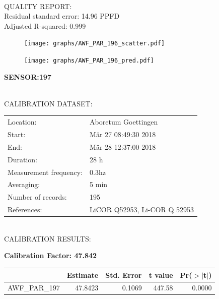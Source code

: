 \documentclass[oneside]{report}
\begin{document}
\hrulefill\\
QUALITY REPORT:\\
Residual standard error: 14.96 PPFD\\
Adjusted R-squared: 0.999



\begin{figure}[H]
  \centering
  \texttt{[image: graphs/AWF\_PAR\_196\_scatter.pdf]}
\end{figure}




\begin{figure}[H]
  \centering
  \texttt{[image: graphs/AWF\_PAR\_196\_pred.pdf]}
\end{figure}

\pagebreak


\begin{center}
\large{\textbf{SENSOR:197}}\\
\end{center}

\hrulefill\\
CALIBRATION DATASET:\\
\begin{table}[h!]
  \centering
  \label{tab:table1}
  \begin{tabular}{ll}
    Location: & Aboretum Goettingen\\ 
    
    
    Start:  & Mär 27 08:49:30 2018 \\
    End:   & Mär 28 12:37:00 2018\\ 
    Duration: & 28 h\\
    Measurement frequency: & 0.3hz\\
    Averaging:  &5 min\\
    Number of records: & 195 \\
    References: & LiCOR Q52953, Li-COR Q 52953 \\
  \end{tabular}
\end{table}

\hrulefill\\
CALIBRATION RESULTS:\\


\begin{center}
\textbf{\large{Calibration Factor: 47.842}}\\
\end{center}
\begin{table}[ht]
\centering
\begin{tabular}{rrrrr}
  \hline
 & Estimate & Std. Error & t value & Pr($>$$|$t$|$) \\ 
  \hline
AWF\_PAR\_197 & 47.8423 & 0.1069 & 447.58 & 0.0000 \\ 
   \hline
\end{tabular}
\end{table}
\end{document}
